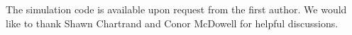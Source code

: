 \documentclass[draft]{agujournal2018}
\begin{document}

\acknowledgments
The simulation code is available upon request from the first author. We would like to thank Shawn Chartrand and Conor McDowell for helpful discussions. 


\end{document}
